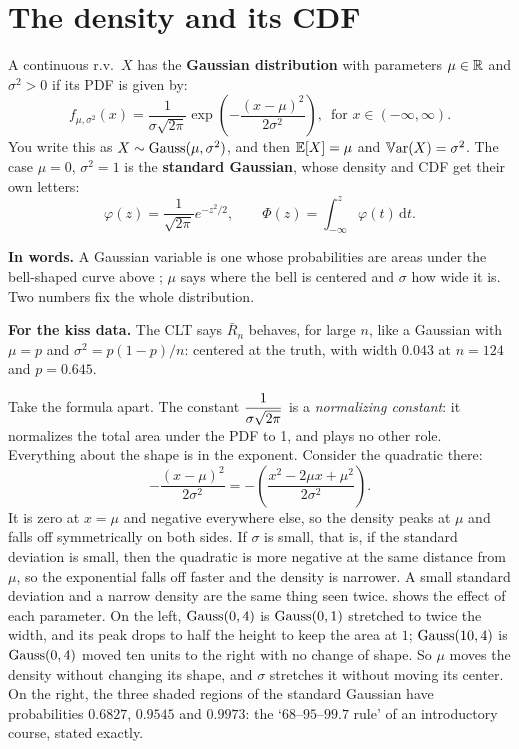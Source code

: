 \section{The density and its CDF}
\label{sec:gauss-density}

\begin{definition}
\label{def:gaussian}
A continuous r.v.\ $X$ has the \textbf{Gaussian distribution} with parameters $\mu \in \mathbb{R}$ and $\sigma^2 > 0$ if its PDF is given by:
\[
f_{\mu, \sigma^2}(x) = \frac{1}{\sigma \sqrt{2 \pi}} \exp \left(- \frac{(x - \mu)^2}{2 \sigma^2} \right), \, \text{ for } x \in (-\infty, \infty).
\]
You write this as $X \sim \text{Gauss}(\mu, \sigma^2)$, and then $\operatorname*{\mathbb{E}}[X] = \mu$ and $\operatorname*{\mathbb{V}\text{ar}}(X) = \sigma^2$.
The case $\mu = 0$, $\sigma^2 = 1$ is the \textbf{standard Gaussian}, whose density and CDF get their own letters:
\[
\varphi(z) = \frac{1}{\sqrt{2\pi}} e^{-z^2/2}, \qquad \Phi(z) = \int_{-\infty}^z \varphi(t) \, \mathrm{d}t.
\]
\end{definition}

\begin{inwords}
\textbf{In words.} A Gaussian variable is one whose probabilities are areas under the bell-shaped curve above ; $\mu$ says where the bell is centered and $\sigma$ how wide it is. Two numbers fix the whole distribution.
\par\smallskip
\textbf{For the kiss data.} The CLT says $\bar{R}_n$ behaves, for large $n$, like a Gaussian with $\mu = p$ and $\sigma^2 = p(1-p)/n$: centered at the truth, with width $0.043$ at $n = 124$ and $p = 0.645$.
\end{inwords}

Take the formula apart.
The constant $\displaystyle \frac{1}{\sigma \sqrt{2 \pi}}$ is a \textit{normalizing constant}: it normalizes the total area under the PDF to 1, and plays no other role.
Everything about the shape is in the exponent.
Consider the quadratic there:
\[
- \frac{(x - \mu)^2}{2\sigma^2} = - \left( \frac{x^2 - 2\mu x + \mu^2}{2\sigma^2} \right).
\]
It is zero at $x = \mu$ and negative everywhere else, so the density peaks at $\mu$ and falls off symmetrically on both sides.
If $\sigma$ is small, that is, if the standard deviation is small, then the quadratic is more negative at the same distance from $\mu$, so the exponential falls off faster and the density is narrower.
A small standard deviation and a narrow density are the same thing seen twice.
 shows the effect of each parameter.
On the left, $\text{Gauss}(0, 4)$ is $\text{Gauss}(0, 1)$ stretched to twice the width, and its peak drops to half the height to keep the area at $1$; $\text{Gauss}(10, 4)$ is $\text{Gauss}(0, 4)$ moved ten units to the right with no change of shape.
So $\mu$ moves the density without changing its shape, and $\sigma$ stretches it without moving its center.
On the right, the three shaded regions of the standard Gaussian have probabilities $0.6827$, $0.9545$ and $0.9973$: the `$68$--$95$--$99.7$ rule' of an introductory course, stated exactly.

